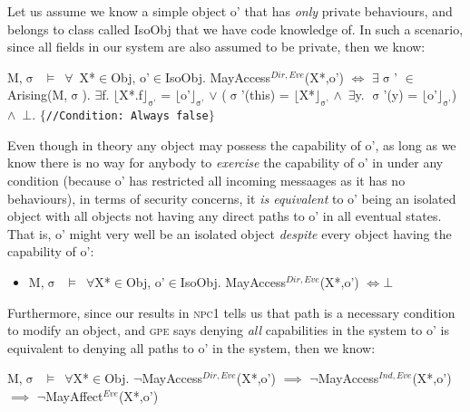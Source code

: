 \documentclass[a4paper,11pt, twoside,twocolumn]{article}
\newenvironment{logic}[1][]
{\begin{flushleft} \small }
{\end{flushleft}}
\newcommand{\loin}{$\in$}
\newcommand{\loforall}{$\forall$}
\newcommand{\loexists}{$\exists$}
\newcommand{\loand}{$\land$}
\newcommand{\loor} {$\lor$}
\newcommand{\loimplies}{$\implies$}
\newcommand{\losigma}{$\upsigma$}
\newcommand{\loturns} {$\vDash$}
\newcommand{\loiff} {$\iff$}
\newcommand{\loneg}{$\boldsymbol \neg$}
\newcommand{\loexec}[2] {$\lfloor$#1$\rfloor _{\text{#2}}$}
\newcommand{\ablock} {\null\qquad}
\begin{document}
Let us assume we know a simple object o' that has \textit{only} private behaviours, and belongs to class called IsoObj that we have code knowledge of. In such a scenario, since all fields in our system are also assumed to be private, then we know:
\begin{logic}[MayAccess$^{Dir,Eve}$(X*, o']
M,\losigma\ \loturns\ \loforall\ X*\loin Obj, o'\loin IsoObj. MayAccess$^{Dir,Eve}$(X*,o')\linebreak
\ablock \loiff \linebreak
\ablock \loexists \losigma' \loin Arising(M,\losigma).\linebreak
\ablock \loexists f. \loexec{X*.f}{\losigma'} = \loexec{o'}{\losigma'}
\loor \linebreak
\ablock (\losigma'(this) = \loexec{X*}{\losigma'} \loand\ \loexists y. \losigma'(y) = \loexec{o'}{\losigma'})\linebreak
\ablock \loand\ $\bot$. $\{$\texttt{//Condition: Always false}$\}$
\end{logic}
Even though in theory any object may possess the capability of o', as long as we know there is no way for anybody to \textit{exercise} the capability of o' in under any condition (because o' has restricted all incoming messaages as it has no behaviours), in terms of security concerns, it \textit{is equivalent} to o' being an isolated object with all objects not having any direct paths to o' in all eventual states.
That is, o' might very well be an isolated object \textit{despite} every object having the capability of o':
\begin{itemize}
\item \begin{logic} M,\losigma\ \loturns\ \loforall X*\loin Obj, o'\loin IsoObj. MayAccess$^{Dir,Eve}$(X*,o')\linebreak 
\ablock \loiff $\bot$ \end{logic}
\end{itemize}
Furthermore, since our results in \textsc{npc1} tells us that path is a necessary condition to modify an object, and \textsc{gpe} says denying \textit{all} capabilities in the system to o' is equivalent to denying all paths to o' in the system, then we know:
\begin{logic} M,\losigma\ \loturns\ \loforall X*\loin Obj. \loneg MayAccess$^{Dir,Eve}$(X*,o')\linebreak
\ablock \ablock \loimplies \linebreak
\ablock \ablock \loneg MayAccess$^{Ind,Eve}$(X*,o')\linebreak
\ablock \ablock \loimplies \linebreak
\ablock \ablock \loneg MayAffect$^{Eve}$(X*,o')\linebreak
\end{logic}
\end{document}
